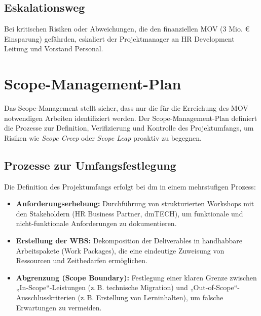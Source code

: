 \subsection{Eskalationsweg}
Bei kritischen Risiken oder Abweichungen, die den finanziellen \acs{MOV} (3 Mio. € Einsparung) gefährden, eskaliert der Projektmanager an \acs{HR} Development Leitung und Vorstand Personal.


\section{Scope-Management-Plan}
\label{sec:scope_management}

Das Scope-Management stellt sicher, dass nur die für die Erreichung des \ac{MOV} notwendigen Arbeiten identifiziert werden. Der Scope-Management-Plan definiert die Prozesse zur Definition, Verifizierung und Kontrolle des Projektumfangs, um Risiken wie \textit{Scope Creep} oder \textit{Scope Leap} proaktiv zu begegnen.

\subsection{Prozesse zur Umfangsfestlegung}
Die Definition des Projektumfangs erfolgt bei dm in einem mehrstufigen Prozess:
\begin{itemize}
    \item \textbf{Anforderungserhebung:} Durchführung von strukturierten Workshops mit den Stakeholdern (\acs{HR} Business Partner, \ac{dmTECH}), um funktionale und nicht-funktionale Anforderungen zu dokumentieren.
    \item \textbf{Erstellung der \ac{WBS}:} Dekomposition der Deliverables in handhabbare Arbeitspakete (Work Packages), die eine eindeutige Zuweisung von Ressourcen und Zeitbedarfen ermöglichen.
    \item \textbf{Abgrenzung (Scope Boundary):} Festlegung einer klaren Grenze zwischen „In-Scope“-Leistungen (z.\,B. technische Migration) und „Out-of-Scope“-Ausschlusskriterien (z.\,B. Erstellung von Lerninhalten), um falsche Erwartungen zu vermeiden.
\end{itemize}

